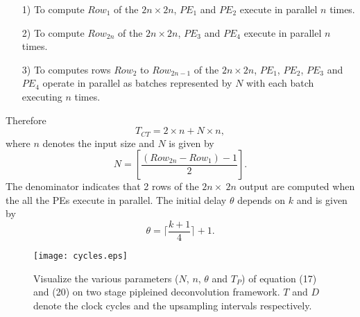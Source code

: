 \documentclass[journal]{IEEEtran}
\begin{document}
\begin{itemize}[leftmargin=*]
	\item[1)] To compute $Row_1$ of the $2n\times2n$, $PE_1$ and $PE_2$ execute in parallel $n$ times.
	\item[2)] To compute $Row_{2n}$ of the $2n\times2n$, $PE_3$ and $PE_4$ execute in parallel $n$ times.
	\item[3)] To computes rows $Row_2$ to $Row_{2n-1}$ of the $2n\times2n$, $PE_1$, $PE_2$, $PE_3$ and $PE_4$ operate in parallel as batches represented by $N$ with each batch  executing $n$ times.
\end{itemize}
Therefore 
\begin{equation}
    T_{CT}=2 \times n + N \times n ,
\end{equation}
where $n$ denotes the input size  and $N$ is given by
\begin{equation}
N=\left [ \frac{\left ( Row_{2n}-Row_{1}\right )-1}{2} \right ] .
\end{equation}
The denominator indicates that 2 rows of the $2n\times\ 2n$ output are computed when the all the PEs execute in parallel. The initial delay $\theta$ depends on $k$ and is given by
\begin{equation}
     \theta =  \lceil \frac{k+1}{4} \rceil + 1 .
\end{equation}
\begin{figure}[h]
	\centering
	\texttt{[image: cycles.eps]}
	\caption{Visualize the various parameters ($N$, $n$, $\theta$ and $T_P$) of equation (17) and (20) on two stage pipleined deconvolution framework. $T$ and $D$ denote the clock cycles and the upsampling intervals respectively.}
	\label{fig12}
\end{figure}
\end{document}
